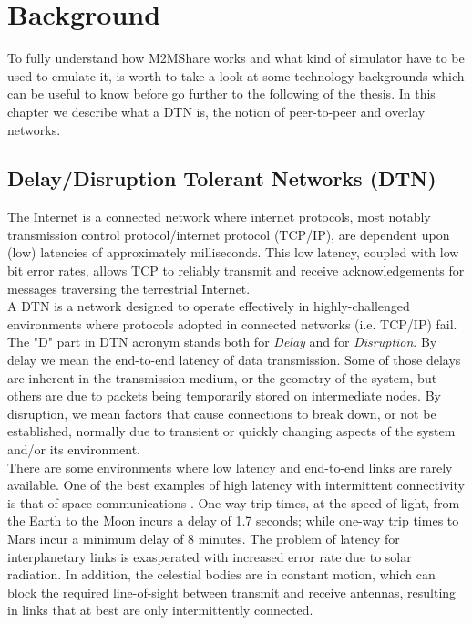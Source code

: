 
\chapter{Background}\label{background} %





To fully understand how M2MShare works and what kind of simulator have to be used to emulate it, is worth to take a look at some technology backgrounds which can be useful to know before go further to the following of the thesis. In this chapter we describe what a DTN is, the notion of peer-to-peer and overlay networks.

\section{Delay/Disruption Tolerant Networks (DTN)}
The Internet is a connected network where internet protocols, most notably transmission control protocol/internet protocol (TCP/IP), are dependent upon (low) latencies of approximately milliseconds. This low latency, coupled with low bit error rates, allows TCP to reliably transmit and receive acknowledgements for messages traversing the terrestrial Internet. 
\\

A DTN is a network designed to operate effectively in highly-challenged environments where protocols adopted in connected networks (i.e. TCP/IP) fail. The "D" part in DTN acronym stands both for \textit{Delay} and for \textit{Disruption}. By delay we mean the end-to-end latency of data transmission. Some of those delays are inherent in the transmission medium, or the geometry of the system, but others are due to packets being temporarily stored on intermediate nodes. By disruption, we mean factors that cause connections to break down, or not be established, normally due to transient or quickly changing aspects of the system and/or its environment.
\\

There are some environments where low latency and end-to-end links are rarely available. One of the best examples of high latency with intermittent connectivity is that of space communications \cite{Burleigh2003365}. One-way trip times, at the speed of light, from the Earth to the Moon incurs a delay of 1.7 seconds; while one-way trip times to Mars incur a minimum delay of 8 minutes. The problem of latency for interplanetary links is exasperated with increased error rate due to solar radiation. In addition, the celestial bodies are in constant motion, which can block the required line-of-sight between transmit and receive antennas, resulting in links that at best are only intermittently connected. 
\\

